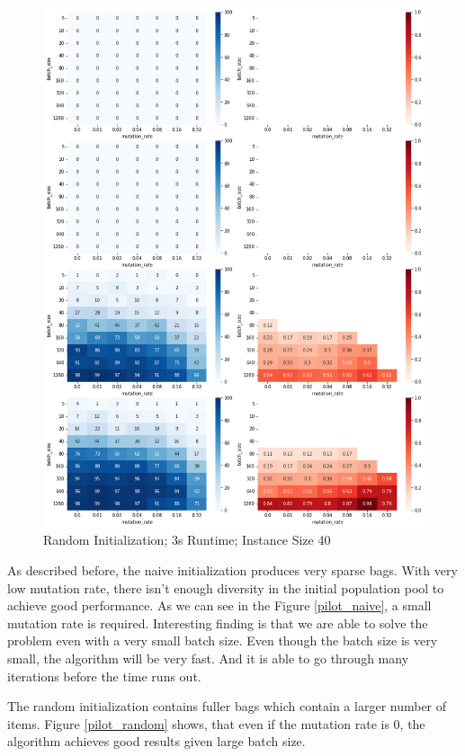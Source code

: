 \documentclass[a4paper,10pt]{article}
\begin{document}
\begin{figure}[!htb]
	\centering
  	\includegraphics[width=\textwidth]{images/pilot_counts_means.png}
	\caption{Random Initialization; 3s Runtime; Instance Size 40}
	\label{detail}
\end{figure}

As described before, the naive initialization produces very sparse bags. With very low mutation rate, there isn't enough diversity in the initial population pool to achieve good performance. As we can see in the Figure \ref{pilot_naive}, a small mutation rate is required. Interesting finding is that we are able to solve the problem even with a very small batch size. Even though the batch size is very small, the algorithm will be very fast. And it is able to go through many iterations before the time runs out.

The random initialization contains fuller bags which contain a larger number of items. Figure \ref{pilot_random} shows, that even if the mutation rate is $0$, the algorithm achieves good results given large batch size. 
\end{document}

